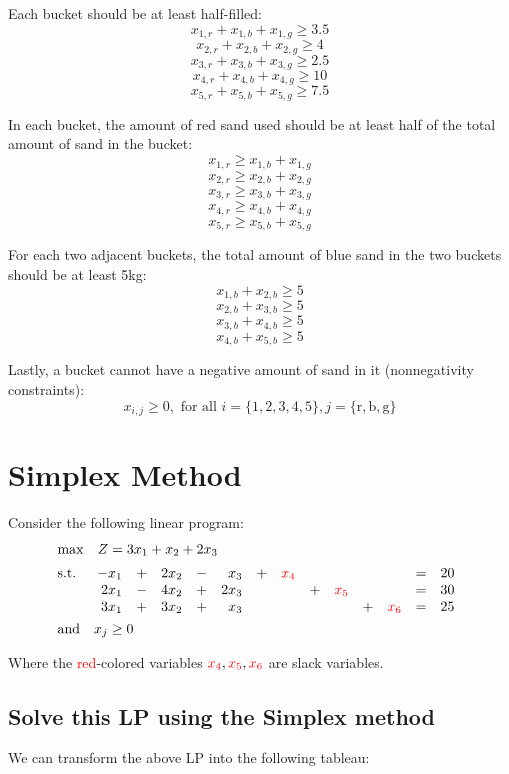 \documentclass[12pt]{article}
\begin{document}
\newpage
\noindent
Each bucket should be at least half-filled:
\[ x_{1,r} + x_{1,b} + x_{1,g} \geq 3.5 \]
\[ x_{2,r} + x_{2,b} + x_{2,g} \geq 4 \]
\[ x_{3,r} + x_{3,b} + x_{3,g} \geq 2.5 \]
\[ x_{4,r} + x_{4,b} + x_{4,g} \geq 10 \]
\[ x_{5,r} + x_{5,b} + x_{5,g} \geq 7.5 \]

\noindent
In each bucket, the amount of red sand used should be at least half of the total amount of sand in the bucket:
\[ x_{1,r} \geq x_{1,b} + x_{1,g} \]
\[ x_{2,r} \geq x_{2,b} + x_{2,g} \]
\[ x_{3,r} \geq x_{3,b} + x_{3,g} \]
\[ x_{4,r} \geq x_{4,b} + x_{4,g} \]
\[ x_{5,r} \geq x_{5,b} + x_{5,g} \]

\noindent
For each two adjacent buckets, the total amount of blue sand in the two buckets should be at least 5kg:
\[ x_{1,b} + x_{2,b} \geq 5 \]
\[ x_{2,b} + x_{3,b} \geq 5 \]
\[ x_{3,b} + x_{4,b} \geq 5 \]
\[ x_{4,b} + x_{5,b} \geq 5 \]

\noindent
Lastly, a bucket cannot have a negative amount of sand in it (nonnegativity constraints):
\[ x_{i,j} \geq 0, \text{ for all } i = \{1, 2, 3, 4, 5\}, j = \{\text{r}, \text{b}, \text{g}\} \]

%
%
\newpage
\section{Simplex Method}
Consider the following linear program:
\begin{align*}
  &\mathrm{max} \quad Z = 3x_1 + x_2 + 2x_3 \\[2pt]
  &\mathrm{s.t.} \quad 
  \begin{array}[t]{r c r c r c r c r c r c r c}
      -x_1 & + & 2x_2 & - & x_3 & + & \textcolor{red}{x_4} & & & & & = & 20 \\
      2x_1 & - & 4x_2 & + & 2x_3 & & & + & \textcolor{red}{x_5} & & & = & 30 \\
      3x_1 & + & 3x_2 & + & x_3 & & & & & + & \textcolor{red}{x_6} & = & 25
  \end{array}\\
  &\mathrm{and} \quad x_j \geq 0
\end{align*}

\noindent
Where the \textcolor{red}{red}-colored variables $\textcolor{red}{x_4}, \textcolor{red}{x_5}, \textcolor{red}{x_6}$ are slack variables.

\subsection{Solve this LP using the Simplex method}
We can transform the above LP into the following tableau:
\end{document}
